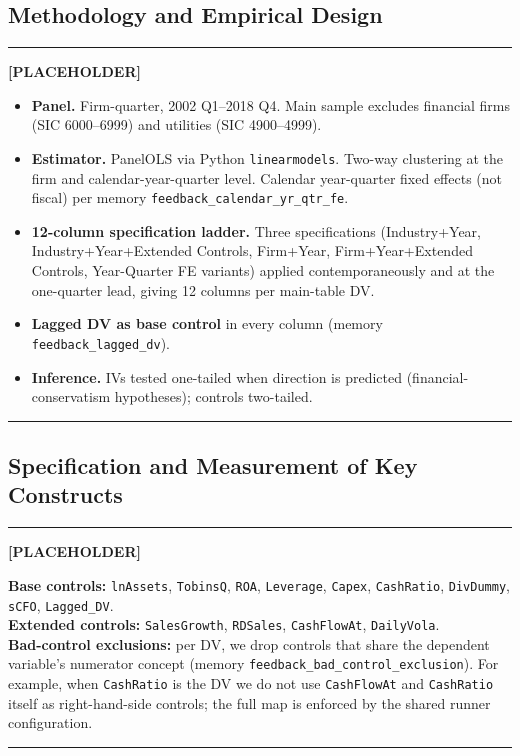 \documentclass[11pt,a4paper,twocolumn]{article}
\newenvironment{placeholder}{%
  \par\medskip\noindent%
  {\color{placeholderaccent}\rule{\linewidth}{0.4pt}}\par%
  \noindent\textbf{\color{placeholderaccent}[PLACEHOLDER]}\par%
  \smallskip\itshape%
}{%
  \par\upshape\smallskip%
  {\color{placeholderaccent}\rule{\linewidth}{0.4pt}}\par\medskip%
}
\begin{document}
\subsection{Methodology and Empirical Design}
\label{sec:framework_method}
\begin{placeholder}
\begin{itemize}
  \item \textbf{Panel.} Firm-quarter, 2002 Q1--2018 Q4. Main sample
        excludes financial firms (SIC 6000--6999) and utilities
        (SIC 4900--4999).
  \item \textbf{Estimator.} PanelOLS via Python \texttt{linearmodels}.
        Two-way clustering at the firm and calendar-year-quarter level.
        Calendar year-quarter fixed effects (not fiscal) per
        memory \texttt{feedback\_calendar\_yr\_qtr\_fe}.
  \item \textbf{12-column specification ladder.} Three specifications
        (Industry+Year, Industry+Year+Extended Controls, Firm+Year,
        Firm+Year+Extended Controls, Year-Quarter FE variants) applied
        contemporaneously and at the one-quarter lead, giving 12 columns
        per main-table DV.
  \item \textbf{Lagged DV as base control} in every column (memory
        \texttt{feedback\_lagged\_dv}).
  \item \textbf{Inference.} IVs tested one-tailed when direction is
        predicted (financial-conservatism hypotheses); controls
        two-tailed.
\end{itemize}
\end{placeholder}

\subsection{Specification and Measurement of Key Constructs}
\label{sec:framework_specs}
\begin{placeholder}
\textbf{Base controls:} \texttt{lnAssets}, \texttt{TobinsQ},
\texttt{ROA}, \texttt{Leverage}, \texttt{Capex}, \texttt{CashRatio},
\texttt{DivDummy}, \texttt{sCFO}, \texttt{Lagged\_DV}.\\
\textbf{Extended controls:} \texttt{SalesGrowth}, \texttt{RDSales},
\texttt{CashFlowAt}, \texttt{DailyVola}.\\
\textbf{Bad-control exclusions:} per DV, we drop controls that share
the dependent variable's numerator concept (memory
\texttt{feedback\_bad\_control\_exclusion}). For example, when
\texttt{CashRatio} is the DV we do not use \texttt{CashFlowAt} and
\texttt{CashRatio} itself as right-hand-side controls; the full map is
enforced by the shared runner configuration.
\end{placeholder}
\end{document}
